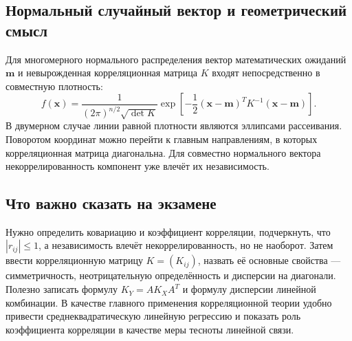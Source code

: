 \subsection{Нормальный случайный вектор и геометрический смысл}

Для многомерного нормального распределения вектор математических ожиданий
$\mathbf m$ и невырожденная корреляционная матрица $K$ входят непосредственно
в совместную плотность:
\[
    f(\mathbf x)=
    \frac{1}{(2\pi)^{n/2}\sqrt{\det K}}
    \exp\!\left[-\frac12
    (\mathbf x-\mathbf m)^T K^{-1}(\mathbf x-\mathbf m)\right].
\]
В двумерном случае линии равной плотности являются эллипсами рассеивания.
Поворотом координат можно перейти к главным направлениям, в которых
корреляционная матрица диагональна. Для совместно нормального вектора
некоррелированность компонент уже влечёт их независимость.

\subsection{Что важно сказать на экзамене}

Нужно определить ковариацию и коэффициент корреляции, подчеркнуть, что
$|r_{ij}|\leq1$, а независимость влечёт некоррелированность, но не наоборот.
Затем ввести корреляционную матрицу $K=(K_{ij})$, назвать её основные свойства
--- симметричность, неотрицательную определённость и дисперсии на диагонали.
Полезно записать формулу $K_Y=AK_XA^T$ и формулу дисперсии линейной комбинации.
В качестве главного применения корреляционной теории удобно привести
среднеквадратическую линейную регрессию и показать роль коэффициента
корреляции в качестве меры тесноты линейной связи.

\newpage
